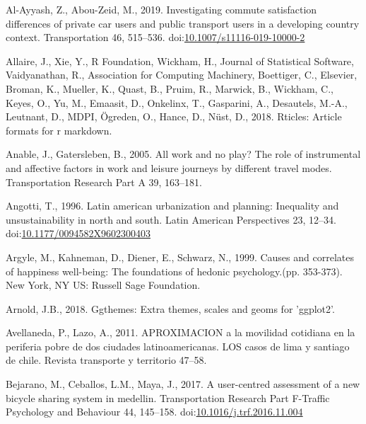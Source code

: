 \documentclass[]{elsarticle} %
\begin{document}
\leavevmode\hypertarget{ref-Alayyash2019commute}{}%
Al-Ayyash, Z., Abou-Zeid, M., 2019. Investigating commute satisfaction
differences of private car users and public transport users in a
developing country context. Transportation 46, 515--536.
doi:\href{https://doi.org/10.1007/s11116-019-10000-2}{10.1007/s11116-019-10000-2}

\leavevmode\hypertarget{ref-Allaire2018rticles}{}%
Allaire, J., Xie, Y., R Foundation, Wickham, H., Journal of Statistical
Software, Vaidyanathan, R., Association for Computing Machinery,
Boettiger, C., Elsevier, Broman, K., Mueller, K., Quast, B., Pruim, R.,
Marwick, B., Wickham, C., Keyes, O., Yu, M., Emaasit, D., Onkelinx, T.,
Gasparini, A., Desautels, M.-A., Leutnant, D., MDPI, Ögreden, O., Hance,
D., Nüst, D., 2018. Rticles: Article formats for r markdown.

\leavevmode\hypertarget{ref-Anable2005work}{}%
Anable, J., Gatersleben, B., 2005. All work and no play? The role of
instrumental and affective factors in work and leisure journeys by
different travel modes. Transportation Research Part A 39, 163--181.

\leavevmode\hypertarget{ref-Angotti1996latin}{}%
Angotti, T., 1996. Latin american urbanization and planning: Inequality
and unsustainability in north and south. Latin American Perspectives 23,
12--34.
doi:\href{https://doi.org/10.1177/0094582X9602300403}{10.1177/0094582X9602300403}

\leavevmode\hypertarget{ref-Argyle1999causes}{}%
Argyle, M., Kahneman, D., Diener, E., Schwarz, N., 1999. Causes and
correlates of happiness well-being: The foundations of hedonic
psychology.(pp. 353-373). New York, NY US: Russell Sage Foundation.

\leavevmode\hypertarget{ref-Arnold2018}{}%
Arnold, J.B., 2018. Ggthemes: Extra themes, scales and geoms for
'ggplot2'.

\leavevmode\hypertarget{ref-Avellaneda2011}{}%
Avellaneda, P., Lazo, A., 2011. APROXIMACION a la movilidad cotidiana en
la periferia pobre de dos ciudades latinoamericanas. LOS casos de lima y
santiago de chile. Revista transporte y territorio 47--58.

\leavevmode\hypertarget{ref-Bejarano2017user}{}%
Bejarano, M., Ceballos, L.M., Maya, J., 2017. A user-centred assessment
of a new bicycle sharing system in medellin. Transportation Research
Part F-Traffic Psychology and Behaviour 44, 145--158.
doi:\href{https://doi.org/10.1016/j.trf.2016.11.004}{10.1016/j.trf.2016.11.004}
\end{document}
